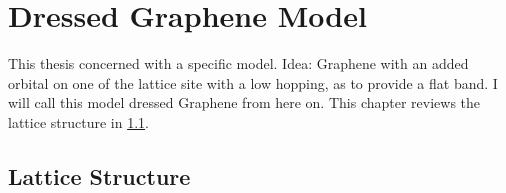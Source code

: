 \documentclass[../notes.tex]{subfiles}
\begin{document}
\raggedbottom

\chapter{Dressed Graphene Model}

This thesis concerned with a specific model.
Idea: Graphene with an added orbital on one of the lattice site with a low hopping, as to provide a flat band.
I will call this model dressed Graphene from here on.
This chapter reviews the lattice structure in \cref{sec:lattice-structure-of-graphene}.



\section{Lattice Structure}\label{sec:lattice-structure-of-graphene}
\end{document}
